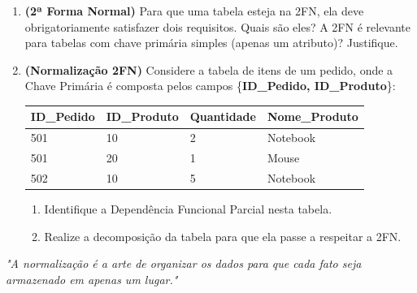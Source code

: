\documentclass[12pt]{article}
\begin{document}
\begin{enumerate}[label=\textbf{Questão \arabic*:}, leftmargin=*]
    \item \textbf{(2ª Forma Normal)} Para que uma tabela esteja na 2FN, ela deve obrigatoriamente satisfazer dois requisitos. Quais são eles? A 2FN é relevante para tabelas com chave primária simples (apenas um atributo)? Justifique.

    \item \textbf{(Normalização 2FN)} Considere a tabela de itens de um pedido, onde a Chave Primária é composta pelos campos \{\textbf{ID\_Pedido, ID\_Produto}\}:
    
    \vspace{0.2cm}
    \centering
    \begin{tabular}{|l|l|l|l|}
        \hline
        \textbf{ID\_Pedido} & \textbf{ID\_Produto} & \textbf{Quantidade} & \textbf{Nome\_Produto} \\ \hline
        501 & 10 & 2 & Notebook \\ \hline
        501 & 20 & 1 & Mouse \\ \hline
        502 & 10 & 5 & Notebook \\ \hline
    \end{tabular}
    \flushleft
    \vspace{0.2cm}
    \begin{enumerate}[label=\alph*)]
        \item Identifique a Dependência Funcional Parcial nesta tabela.
        \item Realize a decomposição da tabela para que ela passe a respeitar a 2FN.
    \end{enumerate}

\end{enumerate}

\vspace{1cm}
\begin{center}
    \textit{"A normalização é a arte de organizar os dados para que cada fato seja armazenado em apenas um lugar."}
\end{center}
\end{document}
